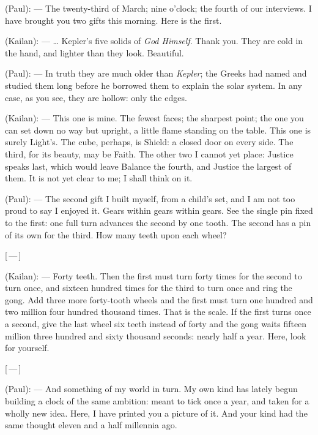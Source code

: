 
\begin{room}

(Paul): --- The twenty-third of March; nine o'clock; the fourth of our interviews. I have brought you two gifts this morning. Here is the first. 

(Kailan): --- \ldots{} Kepler's five solids of \textit{God Himself}. Thank you. They are cold in the hand, and lighter than they look. Beautiful. 

(Paul): --- In truth they are much older than \textit{Kepler}; the Greeks had named and studied them long before he borrowed them to explain the solar system. In any case, as you see, they are hollow: only the edges.

(Kailan): --- This one is mine. The fewest faces; the sharpest point; the one you can set down no way but upright, a little flame standing on the table. This one is surely Light's. The cube, perhaps, is Shield: a closed door on every side. The third, for its beauty, may be Faith. The other two I cannot yet place: Justice speaks last, which would leave Balance the fourth, and Justice the largest of them. It is not yet clear to me; I shall think on it. 

(Paul): --- The second gift I built myself, from a child's set, and I am not too proud to say I enjoyed it. Gears within gears within gears. See the single pin fixed to the first: one full turn advances the second by one tooth. The second has a pin of its own for the third. How many teeth upon each wheel?

\centerline{[\,---\,]}

(Kailan): --- Forty teeth. Then the first must turn forty times for the second to turn once, and sixteen hundred times for the third to turn once and ring the gong. Add three more forty-tooth wheels and the first must turn one hundred and two million four hundred thousand times. That is the scale. If the first turns once a second, give the last wheel six teeth instead of forty and the gong waits fifteen million three hundred and sixty thousand seconds: nearly half a year. Here, look for yourself.

\centerline{[\,---\,]}

(Paul): --- And something of my world in turn. My own kind has lately begun building a clock of the same ambition: meant to tick once a year, and taken for a wholly new idea. Here, I have printed you a picture of it. And your kind had the same thought eleven and a half millennia ago.


\end{room}
